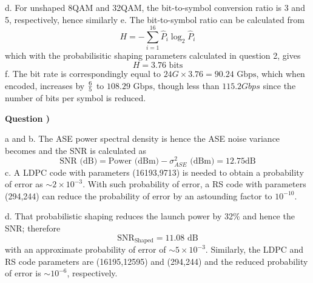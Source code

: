 \documentclass[10pt,letterpaper]{article}
\newcounter{QuestionNumber}
\newcommand{\Q}{
\textbf{Question \theQuestionNumber)}
\stepcounter{QuestionNumber}
}
\newcommand{\nl}{\newline\newline}
\begin{document}
d. For unshaped 8QAM and 32QAM, the bit-to-symbol conversion ratio is 3 and 5, respectively, hence
similarly
e. The bit-to-symbol ratio can be calculated from 
$$
H=-\sum_{i=1}^{16} \hat P_i\log_2 \hat P_i
$$
which with the probabilisitic shaping parameters calculated in question 2, gives 
$$
H=3.76 \text{ bits}
$$
f. The bit rate is correspondingly equal to $24 G\times 3.76=90.24 \text{ Gbps}$, which when encoded, increases by ${6\over 5}$ to $108.29\text{ Gbps}$, though less than $115.2 Gbps$ since the number of bits per symbol is reduced.
\nl
\Q

a and b. The ASE power spectral density is
hence the ASE noise variance becomes
and the SNR is calculated as
$$
\text{SNR (dB)}=\text{Power (dBm)}-\sigma^2_{ASE}\text{ (dBm)}=12.75 \text{dB}
$$
c. A LDPC code with parameters (16193,9713) is needed to obtain a probability of error as $\sim 2\times 10^{-3}$. With such probability of error, a RS code with parameters (294,244) can reduce the probability of error by an astounding factor to $10^{-10}$.

d. That probabilistic shaping reduces the launch power by 32\% and hence the SNR; therefore
$$
\text{SNR}_{\text{Shaped}}=11.08\text{ dB}
$$
with an approximate probability of error of $\sim 5\times 10^{-3}$. Similarly, the LDPC and RS code parameters are (16195,12595) and (294,244) and the reduced probability of error is $\sim 10^{-6}$, respectively.
\end{document}
